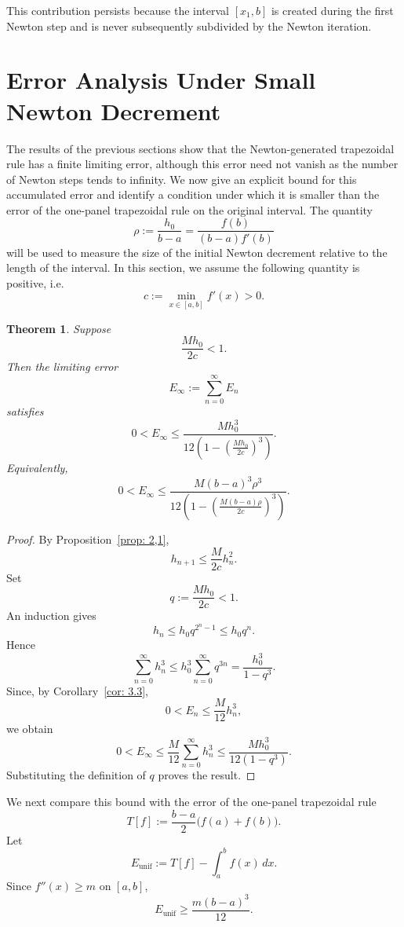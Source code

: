 \documentclass[psamsfonts,reqno]{amsart}
\theoremstyle{plain}
\newtheorem{theorem}{Theorem}[section]
\theoremstyle{definition}
\theoremstyle{remark}
\numberwithin{equation}{section}
\begin{document}
This contribution persists because the interval $[x_1,b]$ is created during the
first Newton step and is never subsequently subdivided by the Newton iteration.




\section{Error Analysis Under Small Newton Decrement}
The results of the previous sections show that the Newton-generated trapezoidal rule has a finite limiting error, although this error need not vanish as the number of Newton steps tends to infinity. We now give an explicit bound for this accumulated error and identify a condition under which it is smaller than the error of the one-panel trapezoidal rule on the original interval. The quantity
\[
\rho:=\frac{h_0}{b-a}
=\frac{f(b)}{(b-a)f'(b)}
\]
will be used to measure the size of the initial Newton decrement relative to the length of the interval. In this section, we assume the following quantity is positive, i.e.
\[
c:=\min_{x\in[a,b]}f'(x)>0.
\]

\begin{theorem}\label{thm:5.1}
Suppose
\[
\frac{Mh_0}{2c}<1.
\]
Then the limiting error
\[
E_\infty:=\sum_{n=0}^{\infty}E_n
\]
satisfies
\[
0<E_\infty
\leq
\frac{Mh_0^3}
{12\left(1-\left(\frac{Mh_0}{2c}\right)^3\right)}.
\]
Equivalently,
\[
0<E_\infty
\leq
\frac{M(b-a)^3\rho^3}
{12\left(1-\left(\frac{M(b-a)\rho}{2c}\right)^3\right)}.
\]
\end{theorem}

\begin{proof}
By Proposition~\ref{prop: 2,1},
\[
h_{n+1}\leq\frac{M}{2c}h_n^2.
\]
Set
\[
q:=\frac{Mh_0}{2c}<1.
\]
An induction gives
\[
h_n\leq h_0q^{2^n-1}\leq h_0q^n.
\]
Hence
\[
\sum_{n=0}^{\infty}h_n^3
\leq
h_0^3\sum_{n=0}^{\infty}q^{3n}
=
\frac{h_0^3}{1-q^3}.
\]
Since, by Corollary~\ref{cor: 3.3},
\[
0<E_n\leq\frac{M}{12}h_n^3,
\]
we obtain
\[
0<E_\infty
\leq
\frac{M}{12}\sum_{n=0}^{\infty}h_n^3
\leq
\frac{Mh_0^3}{12(1-q^3)}.
\]
Substituting the definition of $q$ proves the result.
\end{proof}
\flushleft We next compare this bound with the error of the one-panel trapezoidal rule
\[
T[f]:=\frac{b-a}{2}\bigl(f(a)+f(b)\bigr).
\]
Let
\[
E_{\mathrm{unif}}
:=
T[f]-\int_a^b f(x)\,dx.
\]
Since $f''(x)\geq m$ on $[a,b]$,
\[
E_{\mathrm{unif}}\geq\frac{m(b-a)^3}{12}.
\]
\end{document}
